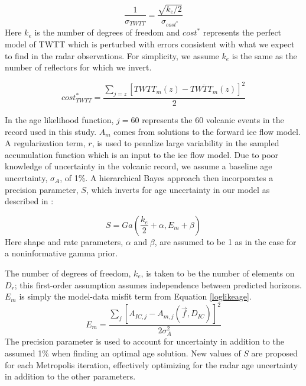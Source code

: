 \begin{equation}
\frac{1}{\sigma_{TWTT}}= \frac{\sqrt{k_e/2}}{\sigma_{cost^*}}
\end{equation}
Here $k_e$ is the number of degrees of freedom and $cost^*$ represents the perfect model of TWTT which is perturbed with errors consistent with what we expect to find in the radar observations. For simplicity, we assume $k_e$ is the same as the number of reflectors for which we invert.

\begin{equation}
cost^*_{TWTT} = \frac{\sum_{j = z}[TWTT_m(z) - \overline{TWTT_m}(z)]^2}{2}
\end{equation}

In the age likelihood function, $j=60$ represents the 60 volcanic events in the record used in this study. $A_m$ comes from solutions to the forward ice flow model. A regularization term, $r$, is used to penalize large variability in the sampled accumulation function which is an input to the ice flow model. Due to poor knowledge of uncertainty in the volcanic record, we assume a baseline age uncertainty, $\sigma_A$, of 1\%.  A hierarchical Bayes approach then incorporates a precision parameter, $S$, which inverts for age uncertainty in our model as described in \citet{jackson&huerta2016}:

\begin{equation}
S = Ga(\frac{k_e}{2}+\alpha, E_m+\beta)
\end{equation}
Here shape and rate parameters, $\alpha$ and $\beta$, are assumed to be 1 as in the case for a noninformative gamma prior. 

The number of degrees of freedom, $k_e$, is taken to be the number of elements on $D_r$; this first-order assumption assumes independence between predicted horizons. $E_m$ is simply the model-data misfit term from Equation \ref{loglikeage}.
\begin{equation}
 E_m= \frac{\sum_{j}[A_{IC,j} - A_{m,j}(\vec{f},D_{IC})]^2}{2\sigma_A^2} 
\end{equation}
The precision parameter is used to account for uncertainty in addition to the assumed 1\% when finding an optimal age solution. New values of $S$ are proposed for each Metropolis iteration, effectively optimizing for the radar age uncertainty in addition to the other parameters.



